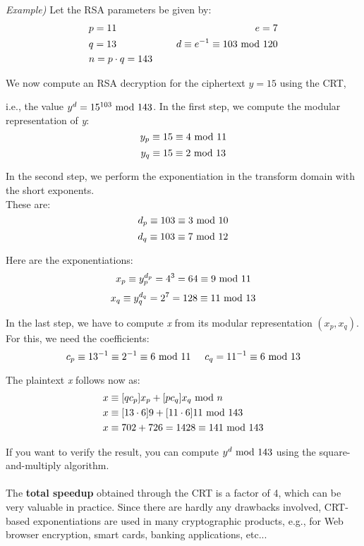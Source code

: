 \textit{Example)} Let the RSA parameters be given by:
\begin{alignat*}{2}
    &p=11 \hspace{0.5cm}&e=7\\
    &q=13 \hspace{0.5cm}&d\equiv e^{-1}\equiv103\text{ mod }120\\
    &n=p\cdot q=143 \hspace{0.5cm}&
\end{alignat*}

We now compute an RSA decryption for the ciphertext $y=15$ using the CRT,

i.e., the value $y^d=15^{103}\text{ mod }143$. In the first step, we compute the modular representation of \textit{y}:
$$y_p\equiv15\equiv4\text{ mod } 11$$
$$y_q\equiv15\equiv2\text{ mod } 13$$

In the second step, we perform the exponentiation in the transform domain with the short exponents.\\

These are:
$$d_p\equiv103\equiv3\text{ mod }10$$
$$d_q\equiv103\equiv7\text{ mod }12$$

Here are the exponentiations:
$$x_p\equiv y_p^{d_p}=4^3=64\equiv9\text{ mod }11$$
$$x_q\equiv y_q^{d_q}=2^7=128\equiv11\text{ mod }13$$

In the last step, we have to compute \textit{x} from its modular representation $(x_p,x_q)$.\\

For this, we need the coefficients:
$$c_p\equiv13^{-1}\equiv2^{-1}\equiv6\text{ mod }11\hspace{0.5cm}c_q=11^{-1}\equiv6\text{ mod }13$$

The plaintext \textit{x} follows now as:
\begin{align*}
    &x\equiv[qc_p]x_p+[pc_q]x_q\text{ mod } n\\
    &x\equiv[13\cdot 6]9 + [11\cdot 6]11\text{ mod } 143\\
    &x\equiv702+726=1428\equiv 141\text{ mod }143
\end{align*}

If you want to verify the result, you can compute $y^d\text{ mod }143$ using the square-and-multiply algorithm.\\\\
The \textbf{total speedup} obtained through the CRT is a factor of 4, which can be very valuable in practice. Since there are hardly any drawbacks involved, CRT-based exponentiations are used in many cryptographic products, e.g., for Web browser encryption, smart cards, banking applications, etc...

